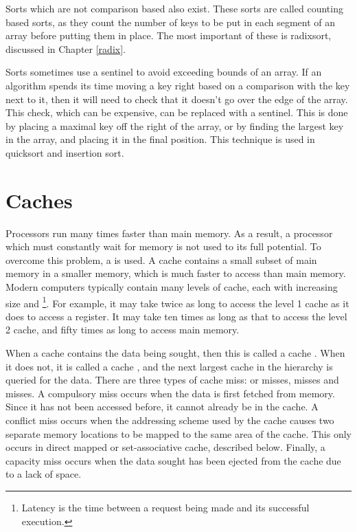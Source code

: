 Sorts which are not comparison based also exist. These sorts are called counting
based sorts, as they count the number of keys to be put in each segment of an
array before putting them in place. The most important of these is radixsort,
discussed in Chapter \ref{radix}.

Sorts sometimes use a sentinel to avoid exceeding bounds of an array. If an
algorithm spends its time moving a key right based on a comparison with the key
next to it, then it will need to check that it doesn't go over the edge of the
array. This check, which can be expensive, can be replaced with a sentinel. This
is done by placing a maximal key off the right of the array, or by finding the
largest key in the array, and placing it in the final position. This technique
is used in quicksort and insertion sort.

\section{Caches}
Processors run many times faster than main memory. As a result, a processor
which must constantly wait for memory is not used to its full potential. To
overcome this problem, a  is used. A cache contains a small
subset of main memory in a smaller memory, which is much faster to access than
main memory. Modern computers typically contain many levels of cache, each with
increasing size and \footnote{Latency is the time between a request
being made and its successful execution.}. For example, it may take twice as
long to access the level 1 cache as it does to access a register. It may take
ten times as long as that to access the level 2 cache, and fifty times as long
to access main memory.

When a cache contains the data being sought, then this is called a cache
. When it does not, it is called a cache , and the next largest
cache in the hierarchy is queried for the data. There are three types of cache
miss:  or  misses,  misses and
 misses. A compulsory miss occurs when the data is first fetched
from memory. Since it has not been accessed before, it cannot already be in the
cache. A conflict miss occurs when the addressing scheme used by the cache
causes two separate memory locations to be mapped to the same area of the cache.
This only occurs in direct mapped or set-associative cache, described below.
Finally, a capacity miss occurs when the data sought has been ejected from the
cache due to a lack of space.

